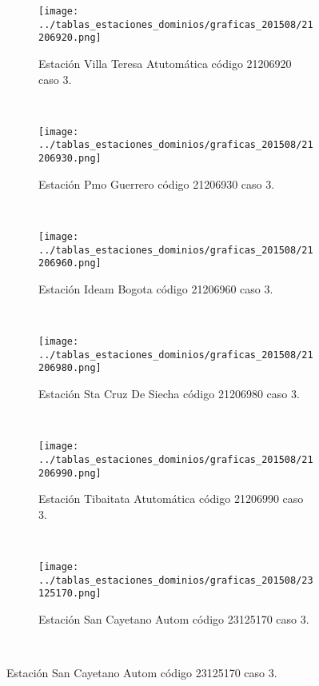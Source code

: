 \begin{figure}[H]\ContinuedFloat
\centering
\begin{subfigure}[normla]{0.4\textwidth}
\texttt{[image: ../tablas\_estaciones\_dominios/graficas\_201508/21206920.png]}
\caption{Estación Villa Teresa Atutomática código 21206920 caso 3.}
\end{subfigure}
~
\begin{subfigure}[normla]{0.4\textwidth}
\texttt{[image: ../tablas\_estaciones\_dominios/graficas\_201508/21206930.png]}
\caption{Estación Pmo Guerrero código 21206930 caso 3.}
\end{subfigure}
~
\begin{subfigure}[normla]{0.4\textwidth}
\texttt{[image: ../tablas\_estaciones\_dominios/graficas\_201508/21206960.png]}
\caption{Estación Ideam Bogota código 21206960 caso 3.}
\end{subfigure}
~
\begin{subfigure}[normla]{0.4\textwidth}
\texttt{[image: ../tablas\_estaciones\_dominios/graficas\_201508/21206980.png]}
\caption{Estación Sta Cruz De Siecha código 21206980 caso 3.}
\end{subfigure}
~
\begin{subfigure}[normla]{0.4\textwidth}
\texttt{[image: ../tablas\_estaciones\_dominios/graficas\_201508/21206990.png]}
\caption{Estación Tibaitata Atutomática código 21206990 caso 3.}
\end{subfigure}
~
\begin{subfigure}[normla]{0.4\textwidth}
\texttt{[image: ../tablas\_estaciones\_dominios/graficas\_201508/23125170.png]}
\caption{Estación San Cayetano Autom código 23125170 caso 3.}
\end{subfigure}
~
\end{figure}
 
